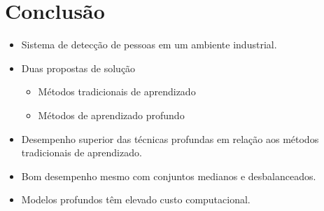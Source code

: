 \section{Conclusão}

\begin{frame}{\insertsection}
	\begin{itemize}
		\item Sistema de detecção de pessoas em um ambiente industrial.
		\item Duas propostas de solução
		\begin{itemize}
			\item Métodos tradicionais de aprendizado
			\item Métodos de aprendizado profundo
		\end{itemize}

		\item Desempenho superior das técnicas profundas em relação aos métodos tradicionais de aprendizado.
		\item Bom desempenho mesmo com conjuntos medianos e desbalanceados.
		\item Modelos profundos têm elevado custo computacional.
	\end{itemize}
\end{frame}

